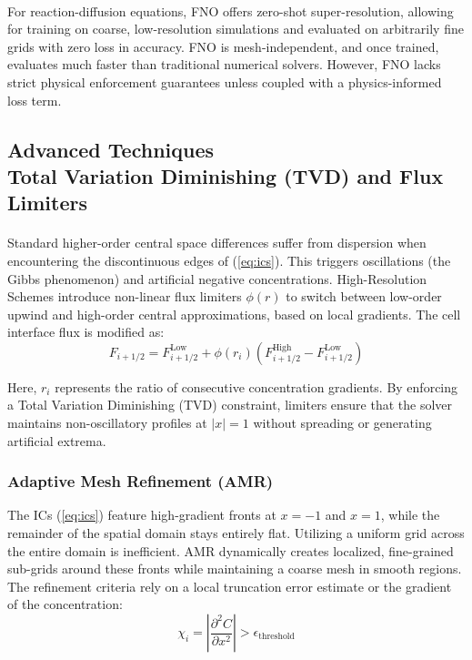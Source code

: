 \paragraph{}
For reaction-diffusion equations, FNO offers zero-shot super-resolution, allowing for training on coarse, low-resolution simulations and evaluated on arbitrarily fine grids with zero loss in accuracy. FNO is mesh-independent, and once trained, evaluates much faster than traditional numerical solvers. However, FNO lacks strict physical enforcement guarantees unless coupled with a physics-informed loss term.

\subsection*{Advanced Techniques\\ \normalsize Total Variation Diminishing (TVD) and Flux Limiters}
\paragraph{}
Standard higher-order central space differences suffer from dispersion when encountering the discontinuous edges of (\ref{eq:ics}). This triggers oscillations (the Gibbs phenomenon) and artificial negative concentrations. High-Resolution Schemes introduce non-linear flux limiters $\phi(r)$ to switch between low-order upwind and high-order central approximations, based on local gradients. The cell interface flux is modified as:
\begin{equation*}
F_{i+1/2} = F_{i+1/2}^{\text{Low}} + \phi(r_i) \left( F_{i+1/2}^{\text{High}} - F_{i+1/2}^{\text{Low}} \right)
\end{equation*}

Here, $r_i$ represents the ratio of consecutive concentration gradients. By enforcing a Total Variation Diminishing (TVD) constraint, limiters ensure that the solver maintains non-oscillatory profiles at $|x|=1$ without spreading or generating artificial extrema.

\subsubsection*{Adaptive Mesh Refinement (AMR)}

The ICs (\ref{eq:ics}) feature high-gradient fronts at $x = -1$ and $x = 1$, while the remainder of the spatial domain stays entirely flat. Utilizing a uniform grid across the entire domain is inefficient. AMR dynamically creates localized, fine-grained sub-grids around these fronts while maintaining a coarse mesh in smooth regions. The refinement criteria rely on a local truncation error estimate or the gradient of the concentration:
\begin{equation*}
\chi_i = \left| \frac{\partial^2 C}{\partial x^2} \right| > \epsilon_{\text{threshold}}
\end{equation*}


